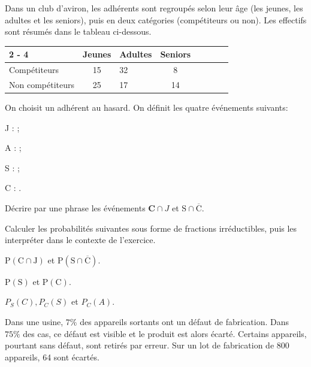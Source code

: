\documentclass[11pt,a4paper]{book}
\begin{document}

Dans un club d'aviron, les adhérents sont regroupés selon leur âge (les jeunes, les adultes et les seniors), puis en deux catégories (compétiteurs ou non).
Les effectifs sont résumés dans le tableau ci-dessous.

\begin{tabular}{|Xc|Xc|Xc|Xc|}
	\cline { 2 - 4 } \multicolumn{1}{c|}{} & Jeunes & Adultes & Seniors \\
	\hline Compétiteurs & 15 & 32 & 8 \\
	\hline Non compétiteurs & 25 & 17 & 14 \\
	\hline
\end{tabular}

On choisit un adhérent au hasard. On définit les quatre événements suivants:
\begin{itemMet}
	\item J : ;
	\item A : ;
	\item S : ;
	\item C : .
\end{itemMet}
\begin{enumMet}
	\item Décrire par une phrase les événements $\mathbf{C} \cap J$ et $\mathrm{S} \cap \overline{\mathrm{C}}$.
	\item Calculer les probabilités suivantes sous forme de fractions irréductibles, puis les interpréter dans le contexte de l'exercice.
	\begin{enumMet}
		\item $\mathrm{P}(\mathrm{C} \cap \mathrm{J})$ et $\mathrm{P}(\mathrm{S} \cap \overline{\mathrm{C}})$.
		\item $\mathrm{P}(\mathrm{S})$ et $\mathrm{P}(\mathrm{C})$.
		\item $P_S(C), P_C(S)$ et $P_C(A)$.
	\end{enumMet}
\end{enumMet}



Dans une usine, $7 \%$ des appareils sortants ont un défaut de fabrication. Dans $75 \%$ des cas, ce défaut est visible et le produit est alors écarté.
Certains appareils, pourtant sans défaut, sont retirés par erreur.
Sur un lot de fabrication de 800 appareils, 64 sont écartés.
\end{document}
